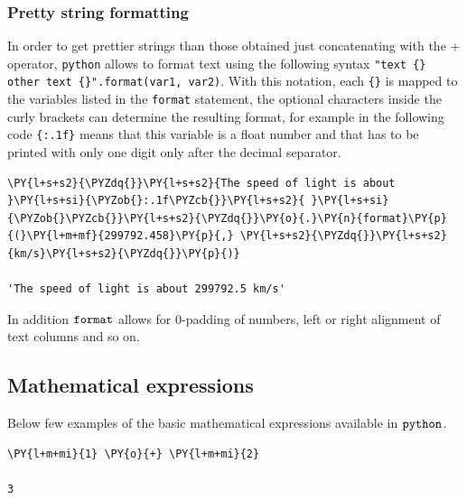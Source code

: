\subsubsection{Pretty string formatting}
In order to get prettier strings than those obtained just concatenating with the + operator, \texttt{python} allows to format text using the following syntax \texttt{"text \{\} other text \{\}".format(var1, var2)}.
With this notation, each \texttt{\{\}} is mapped to the variables listed in the \texttt{format} statement, the optional characters inside the curly brackets can determine the resulting format, for example in the following code \texttt{\{:.1f\}} means that this variable is a float number and that has to be printed with only one digit only after the decimal separator. 

\begin{tcolorbox}[breakable, size=fbox, boxrule=1pt, pad at break*=1mm, colback=cellbackground, colframe=cellborder]            
\begin{Verbatim}[commandchars=\\\{\}]
\PY{l+s+s2}{\PYZdq{}}\PY{l+s+s2}{The speed of light is about }\PY{l+s+si}{\PYZob{}:.1f\PYZcb{}}\PY{l+s+s2}{ }\PY{l+s+si}{\PYZob{}\PYZcb{}}\PY{l+s+s2}{\PYZdq{}}\PY{o}{.}\PY{n}{format}\PY{p}{(}\PY{l+m+mf}{299792.458}\PY{p}{,} \PY{l+s+s2}{\PYZdq{}}\PY{l+s+s2}{km/s}\PY{l+s+s2}{\PYZdq{}}\PY{p}{)}

'The speed of light is about 299792.5 km/s'
\end{Verbatim}
\end{tcolorbox}

In addition $\tt{format}$ allows for 0-padding of numbers, left or right alignment of text columns and so on.

\subsection{Mathematical expressions}\label{mathematical-expressions}

Below few examples of the basic mathematical expressions available in $\tt{python}$.

\begin{tcolorbox}[breakable, size=fbox, boxrule=1pt, pad at break*=1mm, colback=cellbackground, colframe=cellborder]            
\begin{Verbatim}[commandchars=\\\{\}]
\PY{l+m+mi}{1} \PY{o}{+} \PY{l+m+mi}{2}

3
\end{Verbatim}
\end{tcolorbox}

